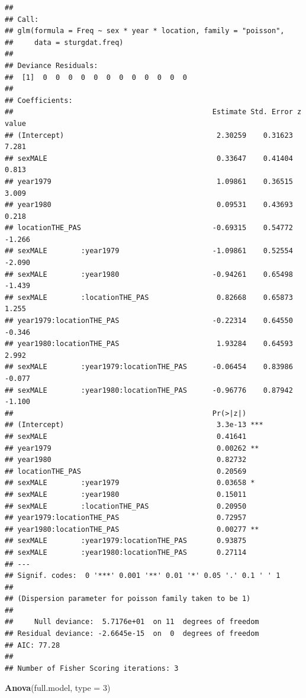 \documentclass[
  12pt,
]{book}
\newenvironment{Shaded}{\begin{snugshade}}{\end{snugshade}}
\newcommand{\DataTypeTok}[1]{\textcolor[rgb]{0.13,0.29,0.53}{#1}}
\newcommand{\DecValTok}[1]{\textcolor[rgb]{0.00,0.00,0.81}{#1}}
\newcommand{\KeywordTok}[1]{\textcolor[rgb]{0.13,0.29,0.53}{\textbf{#1}}}
\newcommand{\NormalTok}[1]{#1}
\begin{document}
\begin{verbatim}
## 
## Call:
## glm(formula = Freq ~ sex * year * location, family = "poisson", 
##     data = sturgdat.freq)
## 
## Deviance Residuals: 
##  [1]  0  0  0  0  0  0  0  0  0  0  0  0
## 
## Coefficients:
##                                               Estimate Std. Error z value
## (Intercept)                                    2.30259    0.31623   7.281
## sexMALE                                        0.33647    0.41404   0.813
## year1979                                       1.09861    0.36515   3.009
## year1980                                       0.09531    0.43693   0.218
## locationTHE_PAS                               -0.69315    0.54772  -1.266
## sexMALE        :year1979                      -1.09861    0.52554  -2.090
## sexMALE        :year1980                      -0.94261    0.65498  -1.439
## sexMALE        :locationTHE_PAS                0.82668    0.65873   1.255
## year1979:locationTHE_PAS                      -0.22314    0.64550  -0.346
## year1980:locationTHE_PAS                       1.93284    0.64593   2.992
## sexMALE        :year1979:locationTHE_PAS      -0.06454    0.83986  -0.077
## sexMALE        :year1980:locationTHE_PAS      -0.96776    0.87942  -1.100
##                                               Pr(>|z|)    
## (Intercept)                                    3.3e-13 ***
## sexMALE                                        0.41641    
## year1979                                       0.00262 ** 
## year1980                                       0.82732    
## locationTHE_PAS                                0.20569    
## sexMALE        :year1979                       0.03658 *  
## sexMALE        :year1980                       0.15011    
## sexMALE        :locationTHE_PAS                0.20950    
## year1979:locationTHE_PAS                       0.72957    
## year1980:locationTHE_PAS                       0.00277 ** 
## sexMALE        :year1979:locationTHE_PAS       0.93875    
## sexMALE        :year1980:locationTHE_PAS       0.27114    
## ---
## Signif. codes:  0 '***' 0.001 '**' 0.01 '*' 0.05 '.' 0.1 ' ' 1
## 
## (Dispersion parameter for poisson family taken to be 1)
## 
##     Null deviance:  5.7176e+01  on 11  degrees of freedom
## Residual deviance: -2.6645e-15  on  0  degrees of freedom
## AIC: 77.28
## 
## Number of Fisher Scoring iterations: 3
\end{verbatim}

\begin{Shaded}
\begin{Highlighting}[]
\KeywordTok{Anova}\NormalTok{(full.model, }\DataTypeTok{type =} \DecValTok{3}\NormalTok{)}
\end{Highlighting}
\end{Shaded}
\end{document}
